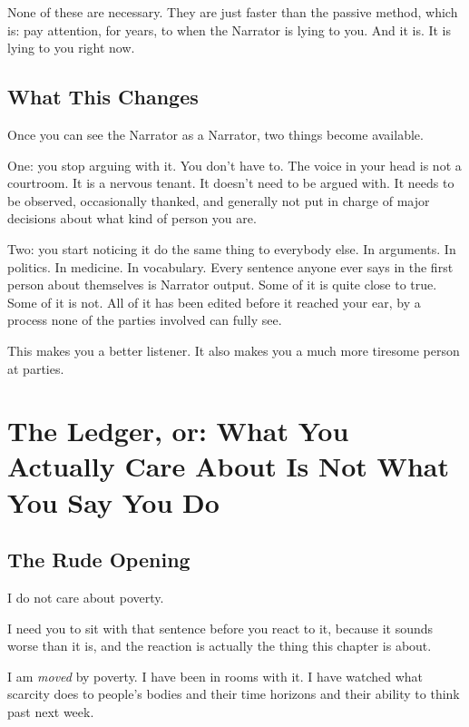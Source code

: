\documentclass[11pt, letterpaper]{article}
\begin{document}
None of these are necessary. They are just faster than the passive method, which is: pay attention, for years, to when the Narrator is lying to you. And it is. It is lying to you right now.

\subsection{What This Changes}

Once you can see the Narrator as a Narrator, two things become available.

One: you stop arguing with it. You don't have to. The voice in your head is not a courtroom. It is a nervous tenant. It doesn't need to be argued with. It needs to be observed, occasionally thanked, and generally not put in charge of major decisions about what kind of person you are.

Two: you start noticing it do the same thing to everybody else. In arguments. In politics. In medicine. In vocabulary. Every sentence anyone ever says in the first person about themselves is Narrator output. Some of it is quite close to true. Some of it is not. All of it has been edited before it reached your ear, by a process none of the parties involved can fully see.

This makes you a better listener. It also makes you a much more tiresome person at parties.

\section{The Ledger, or: What You Actually Care About Is Not What You Say You Do}

\subsection{The Rude Opening}

I do not care about poverty.

I need you to sit with that sentence before you react to it, because it sounds worse than it is, and the reaction is actually the thing this chapter is about.

I am \textit{moved} by poverty. I have been in rooms with it. I have watched what scarcity does to people's bodies and their time horizons and their ability to think past next week.
\end{document}
